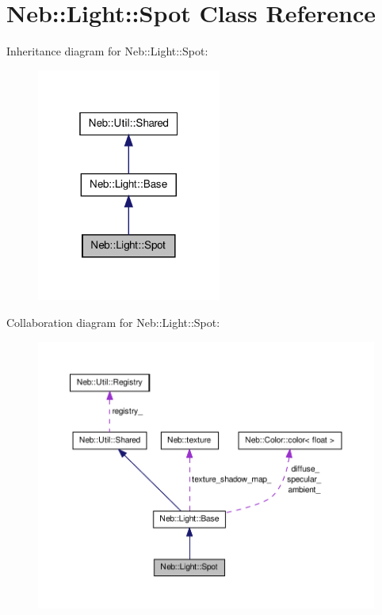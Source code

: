 \hypertarget{classNeb_1_1Light_1_1Spot}{\section{\-Neb\-:\-:\-Light\-:\-:\-Spot \-Class \-Reference}
\label{classNeb_1_1Light_1_1Spot}
}


\-Inheritance diagram for \-Neb\-:\-:\-Light\-:\-:\-Spot\-:\nopagebreak
\begin{figure}[H]
\begin{center}
\leavevmode
\includegraphics[width=172pt]{classNeb_1_1Light_1_1Spot__inherit__graph}
\end{center}
\end{figure}


\-Collaboration diagram for \-Neb\-:\-:\-Light\-:\-:\-Spot\-:\nopagebreak
\begin{figure}[H]
\begin{center}
\leavevmode
\includegraphics[width=350pt]{classNeb_1_1Light_1_1Spot__coll__graph}
\end{center}
\end{figure}
